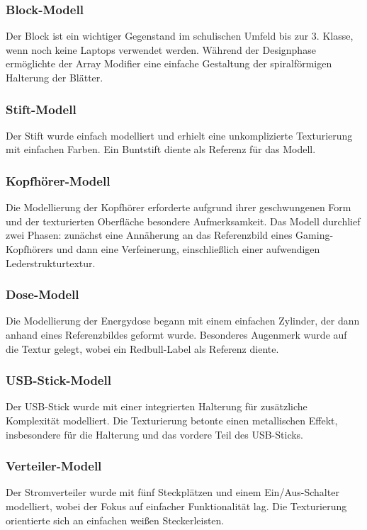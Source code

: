 \subsubsection*{Block-Modell}
Der Block ist ein wichtiger Gegenstand im schulischen Umfeld bis zur 3. Klasse, wenn noch keine Laptops verwendet werden.
Während der Designphase ermöglichte der Array Modifier eine einfache Gestaltung der spiralförmigen Halterung der Blätter.

\subsubsection*{Stift-Modell}
Der Stift wurde einfach modelliert und erhielt eine unkomplizierte Texturierung mit einfachen Farben. Ein Buntstift
diente als Referenz für das Modell.

\subsubsection*{Kopfhörer-Modell}
Die Modellierung der Kopfhörer erforderte aufgrund ihrer geschwungenen Form und der texturierten Oberfläche besondere
Aufmerksamkeit. Das Modell durchlief zwei Phasen: zunächst eine Annäherung an das Referenzbild eines Gaming-Kopfhörers
und dann eine Verfeinerung, einschließlich einer aufwendigen Lederstrukturtextur.

\subsubsection*{Dose-Modell}
Die Modellierung der Energydose begann mit einem einfachen Zylinder, der dann anhand eines Referenzbildes geformt wurde.
Besonderes Augenmerk wurde auf die Textur gelegt, wobei ein Redbull-Label als Referenz diente.

\subsubsection*{USB-Stick-Modell}
Der USB-Stick wurde mit einer integrierten Halterung für zusätzliche Komplexität modelliert. Die Texturierung betonte
einen metallischen Effekt, insbesondere für die Halterung und das vordere Teil des USB-Sticks.

\subsubsection*{Verteiler-Modell}
Der Stromverteiler wurde mit fünf Steckplätzen und einem Ein/Aus-Schalter modelliert, wobei der Fokus auf einfacher
Funktionalität lag. Die Texturierung orientierte sich an einfachen weißen Steckerleisten.

